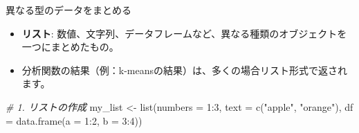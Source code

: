\documentclass[
  ignorenonframetext,
]{beamer}
\newenvironment{Shaded}{\begin{snugshade}}{\end{snugshade}}
\newcommand{\AttributeTok}[1]{\textcolor[rgb]{0.77,0.63,0.00}{#1}}
\newcommand{\CommentTok}[1]{\textcolor[rgb]{0.56,0.35,0.01}{\textit{#1}}}
\newcommand{\DecValTok}[1]{\textcolor[rgb]{0.00,0.00,0.81}{#1}}
\newcommand{\FunctionTok}[1]{\textcolor[rgb]{0.00,0.00,0.00}{#1}}
\newcommand{\NormalTok}[1]{#1}
\newcommand{\OtherTok}[1]{\textcolor[rgb]{0.56,0.35,0.01}{#1}}
\newcommand{\SpecialCharTok}[1]{\textcolor[rgb]{0.00,0.00,0.00}{#1}}
\newcommand{\StringTok}[1]{\textcolor[rgb]{0.31,0.60,0.02}{#1}}
\providecommand{\tightlist}{%
  \setlength{\itemsep}{0pt}\setlength{\parskip}{0pt}}
\begin{document}
\begin{frame}[fragile]{異なる型のデータをまとめる}
\protect\hypertarget{ux7570ux306aux308bux578bux306eux30c7ux30fcux30bfux3092ux307eux3068ux3081ux308b}{}
\begin{itemize}
\tightlist
\item
  \textbf{リスト}:
  数値、文字列、データフレームなど、異なる種類のオブジェクトを一つにまとめたもの。
\item
  分析関数の結果（例：k-meansの結果）は、多くの場合リスト形式で返されます。
\end{itemize}

\scriptsize

\begin{Shaded}
\begin{Highlighting}[]
\CommentTok{\# 1. リストの作成}
\NormalTok{my\_list }\OtherTok{\textless{}{-}} \FunctionTok{list}\NormalTok{(}\AttributeTok{numbers =} \DecValTok{1}\SpecialCharTok{:}\DecValTok{3}\NormalTok{, }
                \AttributeTok{text =} \FunctionTok{c}\NormalTok{(}\StringTok{"apple"}\NormalTok{, }\StringTok{"orange"}\NormalTok{),}
                \AttributeTok{df =} \FunctionTok{data.frame}\NormalTok{(}\AttributeTok{a =} \DecValTok{1}\SpecialCharTok{:}\DecValTok{2}\NormalTok{, }\AttributeTok{b =} \DecValTok{3}\SpecialCharTok{:}\DecValTok{4}\NormalTok{))}
\end{Highlighting}
\end{Shaded}
\end{frame}
\end{document}
